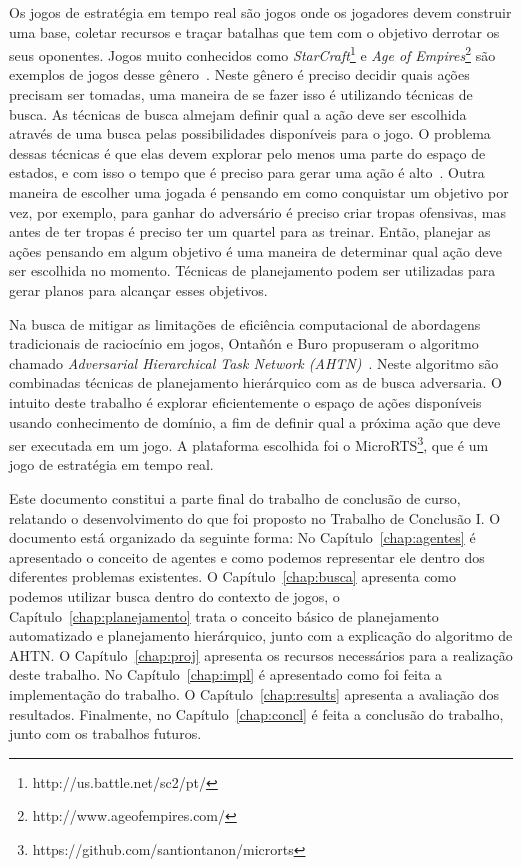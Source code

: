 Os jogos de estratégia em tempo real são jogos onde os jogadores devem construir uma base, coletar recursos e traçar batalhas que tem com o objetivo derrotar os seus oponentes.
Jogos muito conhecidos como \textit{StarCraft}\footnote{http://us.battle.net/sc2/pt/} e \textit{Age of Empires}\footnote{http://www.ageofempires.com/} são exemplos de jogos desse gênero~\cite{ontanon2013survey}.
Neste gênero é preciso decidir quais ações precisam ser tomadas, uma maneira de se fazer isso é utilizando técnicas de busca.
As técnicas de busca almejam definir qual a ação deve ser escolhida através de uma busca pelas possibilidades disponíveis para o jogo. 
O problema dessas técnicas é que elas devem explorar pelo menos uma parte do espaço de estados, e com isso o tempo que é preciso para gerar uma ação é alto~\cite{ontanon2012minimax}.
Outra maneira de escolher uma jogada é pensando em como conquistar um objetivo por vez, por exemplo, para ganhar do adversário é preciso criar tropas ofensivas, mas antes de ter tropas é preciso ter um quartel para as treinar.
Então, planejar as ações pensando em algum objetivo é uma maneira de determinar qual ação deve ser escolhida no momento. 
Técnicas de planejamento podem ser utilizadas para gerar planos para alcançar esses objetivos. 

Na busca de mitigar as limitações de eficiência computacional de abordagens tradicionais de raciocínio em jogos, Ontañón e Buro propuseram o algoritmo chamado \textit{Adversarial Hierarchical Task Network (AHTN)}~\cite{ontanon2015adversarial}. 
Neste algoritmo são combinadas técnicas de planejamento hierárquico com as de busca adversaria. 
O intuito deste trabalho é explorar eficientemente o espaço de ações disponíveis usando conhecimento de domínio, a fim de definir qual a próxima ação que deve ser executada em um jogo. 
A plataforma escolhida foi o MicroRTS\footnote{https://github.com/santiontanon/microrts}, que é um jogo de estratégia em tempo real. 

Este documento constitui a parte final do trabalho de conclusão de curso, relatando o desenvolvimento do que foi proposto no Trabalho de Conclusão I. 
O documento está organizado da seguinte forma: No Capítulo~\ref{chap:agentes} é apresentado o conceito de agentes e como podemos representar ele dentro dos diferentes problemas existentes.
O Capítulo~\ref{chap:busca} apresenta como podemos utilizar busca dentro do contexto de jogos, o Capítulo~\ref{chap:planejamento} trata o conceito básico de planejamento automatizado e planejamento hierárquico, junto com a explicação do algoritmo de AHTN. 
O Capítulo~\ref{chap:proj} apresenta os recursos necessários para a realização deste trabalho.
No Capítulo~\ref{chap:impl} é apresentado como foi feita a implementação do trabalho.
O Capítulo~\ref{chap:results} apresenta a avaliação dos resultados.
Finalmente, no Capítulo~\ref{chap:concl} é feita a conclusão do trabalho, junto com os trabalhos futuros.